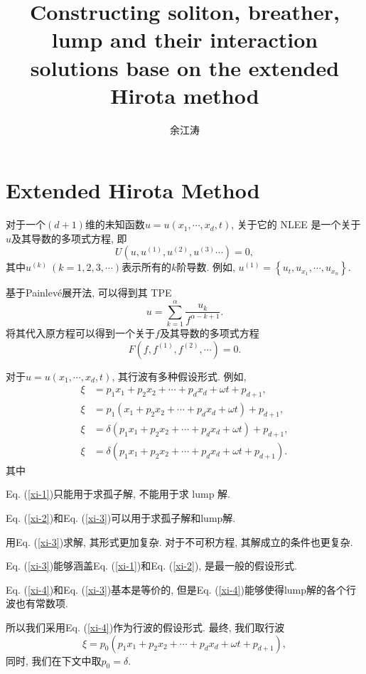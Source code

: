\documentclass{article}
\newcommand{\sbrace}[1]{\left(#1\right)}
\newcommand{\bbrace}[1]{\left\{#1\right\}}
\newcommand{\up}[1]{^{(#1)}}
\newcommand{\Painleve}{Painlev{\'e}}
\newcommand{\refeqn}[1]{Eq. (\ref{#1})}
\begin{document}
\title{Constructing soliton, breather, lump and their interaction solutions base on the extended Hirota method}
\author{余江涛}
\maketitle

\section{Extended Hirota Method}

对于一个$(d+1)$维的未知函数$u=u(x_1,\cdots,x_d,t)$, 关于它的 NLEE 是一个关于$u$及其导数的多项式方程, 即
\begin{equation}
    U(u,u\up{1},u\up{2},u\up{3}\cdots)=0, \label{oeq}
\end{equation}
其中$u\up{k}~(k=1,2,3,\cdots)$表示所有的$k$阶导数. 例如, $u\up{1}=\bbrace{u_t,u_{x_1},\cdots,u_{x_n}}$.

基于\Painleve{}展开法, 可以得到其 TPE
\begin{equation}
u=\sum_{k=1}^{\alpha}{\frac{u_k}{f^{\alpha-k+1}}}. 
\end{equation}
将其代入原方程可以得到一个关于$f$及其导数的多项式方程 
\begin{equation}
F\sbrace{f,f\up{1},f\up{2},\cdots}=0.
\end{equation}

对于$u=u\sbrace{x_1,\cdots,x_d,t}$, 其行波有多种假设形式. 例如, 
\begin{subequations}
\begin{align}
\xi&=p_1 x_1 + p_2 x_2 + \cdots + p_d x_d + \omega t+p_{d+1},  \label{xi-1}\\ 
\xi&=p_1 (x_1 + p_2 x_2 + \cdots + p_d x_d + \omega t)+p_{d+1}, \label{xi-2}\\ 
\xi&=\delta \sbrace{p_1 x_1 + p_2 x_2 + \cdots + p_d x_d + \omega t}+p_{d+1}, \label{xi-3}\\
\xi&=\delta \sbrace{p_1 x_1 + p_2 x_2 + \cdots + p_d x_d + \omega t+p_{d+1}}. \label{xi-4} 
\end{align}
\end{subequations}
其中
\begin{compactitem}[\textbullet]
\item \refeqn{xi-1}只能用于求孤子解, 不能用于求 lump 解.
\item \refeqn{xi-2}和\refeqn{xi-3}可以用于求孤子解和lump解. 
\item 用\refeqn{xi-3}求解, 其形式更加复杂. 对于不可积方程, 其解成立的条件也更复杂.
\item \refeqn{xi-3}能够涵盖\refeqn{xi-1}和\refeqn{xi-2}, 是最一般的假设形式.
\item \refeqn{xi-4}和\refeqn{xi-3}基本是等价的, 但是\refeqn{xi-4}能够使得lump解的各个行波也有常数项.
\end{compactitem}
所以我们采用\refeqn{xi-4}作为行波的假设形式. 最终, 我们取行波
\begin{equation}
  \xi=p_0 \sbrace{p_1 x_1 + p_2 x_2 + \cdots + p_d x_d + \omega t+p_{d+1}},
\end{equation}
同时, 我们在下文中取$p_0=\delta$. 
\end{document}
